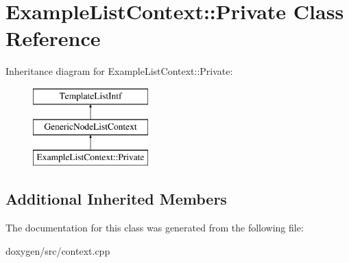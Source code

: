 \hypertarget{class_example_list_context_1_1_private}{}\section{Example\+List\+Context\+::Private Class Reference}
\label{class_example_list_context_1_1_private}
Inheritance diagram for Example\+List\+Context\+::Private\+:\begin{figure}[H]
\begin{center}
\leavevmode
\includegraphics[height=3.000000cm]{class_example_list_context_1_1_private}
\end{center}
\end{figure}
\subsection*{Additional Inherited Members}


The documentation for this class was generated from the following file\+:\begin{DoxyCompactItemize}
\item 
doxygen/src/context.\+cpp\end{DoxyCompactItemize}
